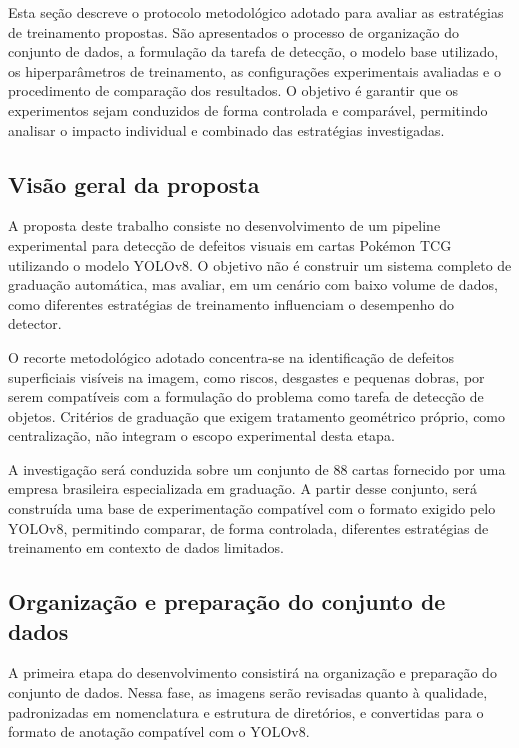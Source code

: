 \documentclass[
    12pt,                %
    openright,           %
    oneside,             %
    a4paper,             %
    english,             %
    brazil               %
]{abntex2}
\begin{document}
Esta seção descreve o protocolo metodológico adotado para avaliar as estratégias de treinamento propostas. São apresentados o processo de organização do conjunto de dados, a formulação da tarefa de detecção, o modelo base utilizado, os hiperparâmetros de treinamento, as configurações experimentais avaliadas e o procedimento de comparação dos resultados. O objetivo é garantir que os experimentos sejam conduzidos de forma controlada e comparável, permitindo analisar o impacto individual e combinado das estratégias investigadas.


\subsection{Visão geral da proposta}
\label{subsec:visao_geral}

A proposta deste trabalho consiste no desenvolvimento de um pipeline 
experimental para detecção de defeitos visuais em cartas Pokémon TCG 
utilizando o modelo YOLOv8. O objetivo não é construir um sistema completo 
de graduação automática, mas avaliar, em um cenário com baixo volume de dados, 
como diferentes estratégias de treinamento influenciam o desempenho do detector.

O recorte metodológico adotado concentra-se na identificação de defeitos 
superficiais visíveis na imagem, como riscos, desgastes e pequenas dobras, 
por serem compatíveis com a formulação do problema como tarefa de detecção 
de objetos. Critérios de graduação que exigem tratamento geométrico próprio, 
como centralização, não integram o escopo experimental desta etapa.

A investigação será conduzida sobre um conjunto de 88 cartas fornecido por 
uma empresa brasileira especializada em graduação. A partir desse conjunto, 
será construída uma base de experimentação compatível com o formato exigido 
pelo YOLOv8, permitindo comparar, de forma controlada, diferentes estratégias 
de treinamento em contexto de dados limitados.

\subsection{Organização e preparação do conjunto de dados}
\label{subsec:dados}

A primeira etapa do desenvolvimento consistirá na organização e preparação
do conjunto de dados. Nessa fase, as imagens serão revisadas quanto à qualidade,
padronizadas em nomenclatura e estrutura de diretórios, e convertidas para o
formato de anotação compatível com o YOLOv8.
\end{document}
